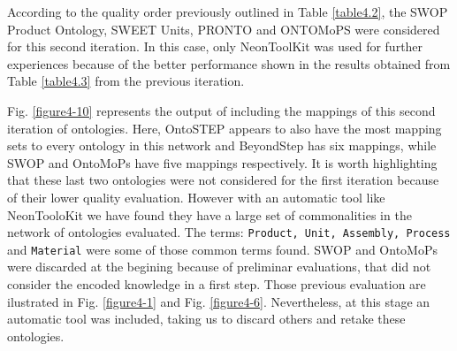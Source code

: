 According to the quality order previously outlined in Table \ref{table4.2}, the SWOP Product Ontology, SWEET Units, PRONTO and ONTOMoPS were considered for this second iteration. In this case, only NeonToolKit was used for further experiences because of the better performance shown in the results obtained from Table \ref{table4.3} from the previous iteration. 

Fig. \ref{figure4-10} represents the output of including the mappings of this second iteration of ontologies. Here, OntoSTEP appears to also have the most mapping sets to every ontology in this network and BeyondStep has six mappings, while SWOP and OntoMoPs have five mappings respectively.  It is worth highlighting that these last two ontologies were not considered for the first iteration because of their lower quality evaluation. However with an automatic tool like NeonTooloKit we have found they have a large set of commonalities in the network of ontologies evaluated. The terms: \texttt{Product, Unit, Assembly, Process} and \texttt{Material} were some of those common terms found. \cbstart  SWOP and OntoMoPs were discarded at the begining because of preliminar evaluations, that did not consider the encoded knowledge in a first step. Those previous evaluation are ilustrated in Fig. \ref{figure4-1} and Fig. \ref{figure4-6}. Nevertheless, at this stage an automatic tool was included, taking us to discard others and retake these ontologies. \cbend




